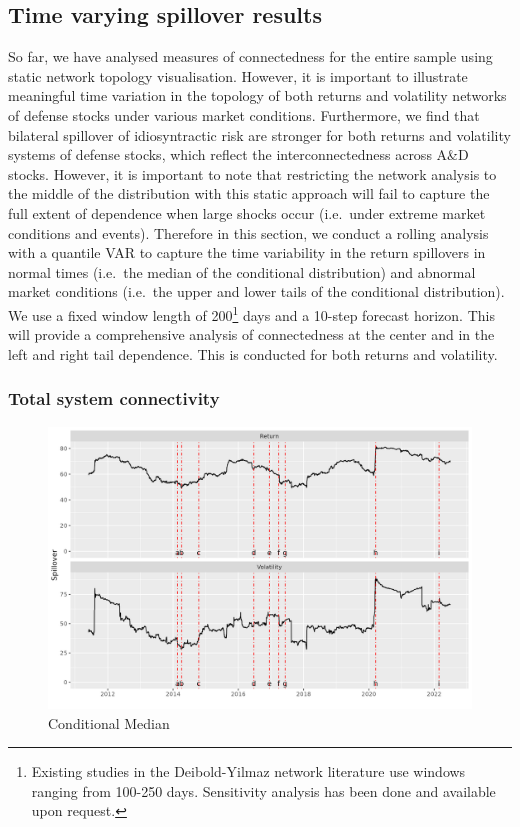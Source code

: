 \documentclass[
  number]{elsarticle}
\begin{document}
\hypertarget{time-varying-spillover-results}{%
\subsection{Time varying spillover
results}\label{time-varying-spillover-results}}

So far, we have analysed measures of connectedness for the entire sample
using static network topology visualisation. However, it is important to
illustrate meaningful time variation in the topology of both returns and
volatility networks of defense stocks under various market conditions.
Furthermore, we find that bilateral spillover of idiosyntractic risk are
stronger for both returns and volatility systems of defense stocks,
which reflect the interconnectedness across A\&D stocks. However, it is
important to note that restricting the network analysis to the middle of
the distribution with this static approach will fail to capture the full
extent of dependence when large shocks occur (i.e.~under extreme market
conditions and events). Therefore in this section, we conduct a rolling
analysis with a quantile VAR to capture the time variability in the
return spillovers in normal times (i.e.~the median of the conditional
distribution) and abnormal market conditions (i.e.~the upper and lower
tails of the conditional distribution). We use a fixed window length of
200\footnote{Existing studies in the Deibold-Yilmaz network literature
  use windows ranging from 100-250 days. Sensitivity analysis has been
  done and available upon request.} days and a 10-step forecast horizon.
This will provide a comprehensive analysis of connectedness at the
center and in the left and right tail dependence. This is conducted for
both returns and volatility.

\hypertarget{total-system-connectivity}{%
\subsubsection{Total system
connectivity}\label{total-system-connectivity}}

\begin{figure}[H]

{\centering \includegraphics{plots/fig-TCI50.png}

}

\caption{\label{fig-TCI50}Conditional Median}

\end{figure}
\end{document}
